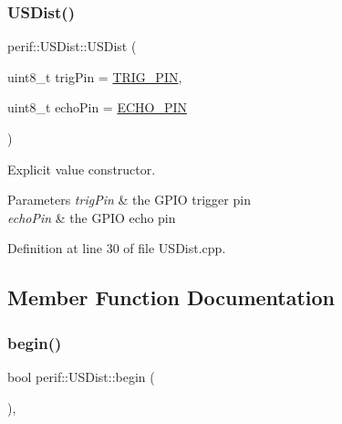 \subsubsection{\texorpdfstring{USDist()}{USDist()}}
{\footnotesize\ttfamily perif\+::\+U\+S\+Dist\+::\+U\+S\+Dist (\begin{DoxyParamCaption}\item[{uint8\+\_\+t}]{trig\+Pin = {\ttfamily \mbox{\hyperlink{USDist_8h_a8eab89acd7dcb0e77e7b00d1749022a6}{T\+R\+I\+G\+\_\+\+P\+IN}}},  }\item[{uint8\+\_\+t}]{echo\+Pin = {\ttfamily \mbox{\hyperlink{USDist_8h_acea96cea4a13b6cb38e57a86788adf90}{E\+C\+H\+O\+\_\+\+P\+IN}}} }\end{DoxyParamCaption})\hspace{0.3cm}{\ttfamily [explicit]}}

Explicit value constructor.


\begin{DoxyParams}{Parameters}
{\em trig\+Pin} & the G\+P\+IO trigger pin \\
\hline
{\em echo\+Pin} & the G\+P\+IO echo pin \\
\hline
\end{DoxyParams}


Definition at line 30 of file U\+S\+Dist.\+cpp.


\begin{DoxyCode}{0}

\end{DoxyCode}


\subsection{Member Function Documentation}
\mbox{\label{classperif_1_1USDist_a0920535901e083c9832dcde3639ab569}} 
\subsubsection{\texorpdfstring{begin()}{begin()}}
{\footnotesize\ttfamily bool perif\+::\+U\+S\+Dist\+::begin (\begin{DoxyParamCaption}{ }\end{DoxyParamCaption})\hspace{0.3cm}{\ttfamily [override]}, {\ttfamily [virtual]}}

